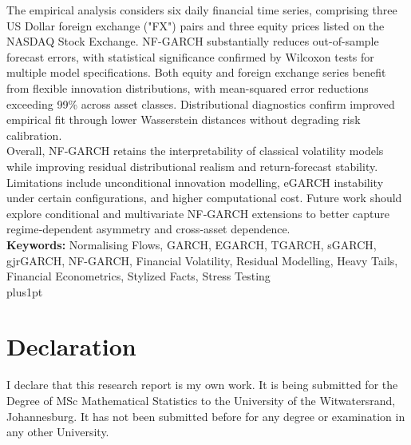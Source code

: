 \documentclass[oneside,12pt]{CUEDthesisPSnPDF}
\begin{document}
The empirical analysis considers six daily financial time series, comprising three US Dollar foreign exchange ("FX") pairs and three equity prices listed on the NASDAQ Stock Exchange. NF-GARCH substantially reduces out-of-sample forecast errors, with statistical significance confirmed by Wilcoxon tests 
for multiple model specifications. Both equity and foreign exchange series benefit from flexible innovation distributions, with mean-squared error reductions exceeding 99\% across asset classes. Distributional diagnostics confirm improved empirical fit through lower Wasserstein distances without 
degrading risk calibration.\\

Overall, NF‑GARCH retains the interpretability of classical volatility models while improving residual distributional realism and return-forecast stability. Limitations include unconditional innovation modelling, eGARCH instability under certain configurations, and higher computational cost. Future work should explore conditional and multivariate NF‑GARCH extensions to better capture regime‑dependent asymmetry and cross‑asset dependence.\\

\textbf{Keywords:} Normalising Flows, GARCH, EGARCH, TGARCH, sGARCH, gjrGARCH, NF-GARCH, Financial Volatility, Residual Modelling, Heavy Tails, Financial Econometrics, Stylized Facts, Stress Testing\\


\renewcommand\baselinestretch{1.5}
\baselineskip=18pt plus1pt
\setcounter{secnumdepth}{4}
\setcounter{tocdepth}{3}
\frontmatter
{}
\tableofcontents

\mainmatter
{}


\noindent 
\chapter*{Declaration}

\noindent I declare that this research report is my own work.  It is being submitted for the Degree of MSc Mathematical Statistics to the University of the Witwatersrand, Johannesburg.  It has not been submitted before for any degree or examination in any other University.\\  
\end{document}
